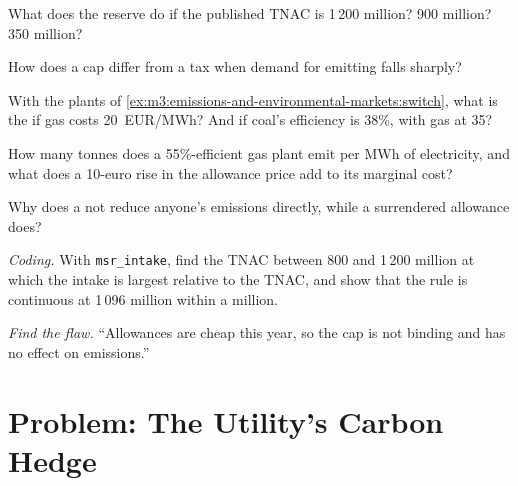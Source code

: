 \begin{exercise}[$\star$]\label{exo:m3:emissions-and-environmental-markets:2}
What does the reserve do if the published TNAC is 1\,200 million? 900 million? 350 million?
\end{exercise}

\begin{exercise}[$\star$]\label{exo:m3:emissions-and-environmental-markets:3}
How does a cap differ from a tax when demand for emitting falls sharply?
\end{exercise}

\begin{exercise}[$\star\star$]\label{exo:m3:emissions-and-environmental-markets:4}
With the plants of \cref{ex:m3:emissions-and-environmental-markets:switch}, what is the  if gas costs \qty{20}{EUR/MWh}? And if coal's efficiency is 38\%, with gas at \qty{35}{}?
\end{exercise}

\begin{exercise}[$\star\star$]\label{exo:m3:emissions-and-environmental-markets:5}
How many tonnes does a 55\%-efficient gas plant emit per MWh of electricity, and what does a 10-euro
rise in the allowance price add to its marginal cost?
\end{exercise}

\begin{exercise}[$\star\star$]\label{exo:m3:emissions-and-environmental-markets:6}
Why does a  not reduce anyone's emissions directly, while a surrendered allowance
does?
\end{exercise}

\begin{exercise}[$\star\star\star$]\label{exo:m3:emissions-and-environmental-markets:7}
\emph{Coding.} With \texttt{msr\_intake}, find the TNAC between 800 and 1\,200 million at which the
intake is largest relative to the TNAC, and show that the rule is continuous at 1\,096 million
within a million.
\end{exercise}

\begin{exercise}[$\star\star\star$]\label{exo:m3:emissions-and-environmental-markets:8}
\emph{Find the flaw.} ``Allowances are cheap this year, so the cap is not binding and has no effect
on emissions.''
\end{exercise}

\section{Problem: The Utility's Carbon Hedge}

